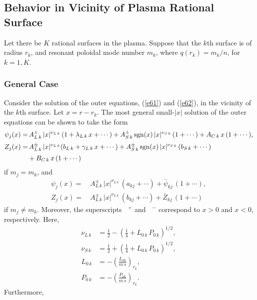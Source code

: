 \documentclass[12pt,prb,aps,notitlepage]{revtex4-1}
\begin{document}
\subsection{Behavior in Vicinity of Plasma Rational Surface}\label{snus}
Let there be $K$ rational surfaces in the plasma. Suppose that the $k$th surface is of radius $r_k$, and resonant
poloidal mode number $m_k$, where $q(r_k)=m_k/n$, for $k=1,K$.

\subsubsection{General Case}
Consider the solution of the outer equations, (\ref{e61}) and (\ref{e62}), in the
vicinity of the $k$th surface. Let  $x=r-r_k$.  The most general small-$|x|$ solution of the outer equations
can be shown to take the form
\begin{align}
\psi_{j}(x)=&\, A_{L\,k}^\pm \,|x|^{\nu_{L\,k}}\,(1+\lambda_{L\,k}\,x+\cdots) + A_{S\,k}^{\pm}\,{\rm sgn}(x)\,|x|^{\nu_{S\,k}}\,(1+\cdots) + A_{C\,k}\,x\,(1+\cdots),\\[0.5ex]
Z_{j}(x)=&\, A_{L\,k}^\pm\,|x|^{\nu_{L\,k}}(b_{L\,k}  + \gamma_{L\,k}\,x+\cdots) + A_{S\,k}^{\pm}\,{\rm sgn}(x)\,|x|^{\nu_{S\,k}}\,(b_{S\,k}+\cdots)\nonumber\\[0.5ex]
& + B_{C\,k}\,x\,(1+\cdots)
\end{align}
if $m_j=m_k$, and 
\begin{align}
\psi_{j}(x)=&\, A_{L\,k}^\pm\,|x|^{\nu_{L\,k}}\,(a_{kj}+\cdots)  + \bar{\psi}_{kj}\,(1+\cdots),\\[0.5ex]
Z_{j}(x)=&\, A_{L\,k}^\pm\,|x|^{\nu_{L\,k}}\,(b_{kj}+\cdots) + \bar{Z}_{kj}\,(1+\cdots)
\end{align}
if $m_j\neq m_k$. Moreover, the superscripts $\phantom{x}^+$ and $\phantom{x}^-$ correspond  to $x>0$ and $x<0$, respectively. Here,
\begin{align}
\nu_{L\,k}&= \frac{1}{2}-\left(\frac{1}{4}+L_{0\,k}\,P_{0\,k}\right)^{1/2},\\[0.5ex]
\nu_{S\,k} &=  \frac{1}{2}+\left(\frac{1}{4}+L_{0\,k}\,P_{0\,k}\right)^{1/2},\\[0.5ex]
L_{0\,k} &=-\left(\frac{L_{kk}}{m\,s}\right)_{r_k},\\[0.5ex]
P_{0\,k} &= -\left(\frac{P_{kk}}{m\,s}\right)_{r_k}.
\end{align}
Furthermore, 
\end{document}
